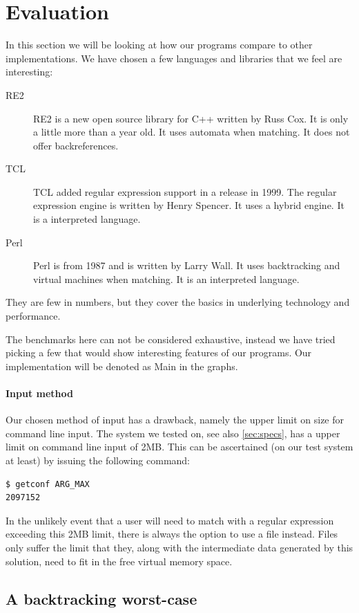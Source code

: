 \section{Evaluation}
\label{sec:evaluation}
In this section we will be looking at how our programs compare to
other implementations. We have chosen a few languages and libraries that we feel
are interesting:
\begin{description}
  \item[RE2] RE2 is a new open source library for C++ written by Russ
    Cox. It is only a little more than a year old. It uses automata
    when matching. It does not offer backreferences.
  \item[TCL]
    TCL added regular expression support in a release in 1999. The
    regular expression engine is written by Henry Spencer. It uses a
    hybrid engine. It is a interpreted language.
  \item[Perl] Perl is from 1987 and is written by Larry Wall. It uses
    backtracking and virtual machines when matching. It is an
    interpreted language. 
\end{description}
They are few in numbers, but they cover the basics in underlying
technology and performance. 

The benchmarks here can not be considered exhaustive, instead we have
tried picking a few that would show interesting features of our
programs. Our implementation will be denoted as Main in
the graphs.

\paragraph{Input method}
Our chosen method of input has a drawback, namely the upper limit on
size for command line input. The system we tested on, see also
\vref{sec:specs}, has a upper limit on command line input of 2MB. This
can be ascertained (on our test system at least) by issuing the
following command:
\begin{verbatim}
$ getconf ARG_MAX
2097152
\end{verbatim}
In the unlikely event that a user will need to match with a regular
expression exceeding this 2MB limit, there is always the option to use
a file instead. Files only suffer the limit that they, along with the intermediate data generated by this solution, need to fit in
the free virtual memory space.

\subsection{A backtracking worst-case}

